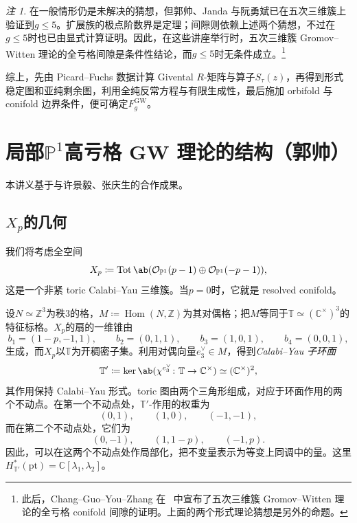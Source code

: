 \documentclass{amsart}
\theoremstyle{definition}
\theoremstyle{remark}
\newtheorem{rmk}[thm]{注}
\theoremstyle{plain}
\theoremstyle{definition}
\theoremstyle{remark}
\newcommand{\C}{\mathbb{C}}
\newcommand{\Z}{\mathbb{Z}}
\renewcommand{\P}{\mathbb{P}}
\newcommand{\mc}[1]{\mathcal{#1}}
\newcommand{\T}{\mathbb{T}}
\newcommand{\mr}[1]{\mathrm{#1}}
\newcommand{\on}[1]{\operatorname{#1}}
\newcommand{\1}{\mathbf{1}}
\newcommand{\2}{\mathbf{2}}
\newcommand{\3}{\mathbf{3}}
\DeclareMathOperator{\Hom}{Hom}
\begin{document}
\begin{rmk}
    在一般情形仍是未解决的猜想，但郭帅、Janda 与阮勇斌已在五次三维簇上验证到\(g \leq 5\)。扩展族的极点阶数界是定理；间隙则依赖上述两个猜想，不过在\(g \leq 5\)时也已由显式计算证明。因此，在这些讲座举行时，五次三维簇 Gromov--Witten 理论的全亏格间隙是条件性结论，而\(g \leq 5\)时无条件成立。\footnote{此后，Chang--Guo--You--Zhang 在~\cite{CGYZ2026} 中宣布了五次三维簇 Gromov--Witten 理论的全亏格 conifold 间隙的证明。上面的两个形式理论猜想是另外的命题。}
\end{rmk}

综上，先由 Picard--Fuchs 数据计算 Givental \(R\)-矩阵与算子\(S_{\tau}(z)\)，再得到形式稳定图和亚纯剩余图，利用全纯反常方程与有限生成性，最后施加 orbifold 与 conifold 边界条件，便可确定\(F_g^{\mr{GW}}\)。

\section{\texorpdfstring{局部\(\P^1\)高亏格 GW 理论的结构}{局部 P1 高亏格 GW 理论的结构}（郭帅）}%
\label{sec:Structure of higher-genus GW theory of local P1 (郭帅)}

本讲义基于与许景毅、张庆生的合作成果。

\subsection{\(X_p\)的几何}%
\label{sub:The geometry of Xp}

我们将考虑全空间
\[ X_p \coloneqq \on{Tot}\ab(\mc{O}_{\P^1}(p-1) \oplus \mc{O}_{\P^1}(-p-1)), \]
这是一个非紧 toric Calabi--Yau 三维簇。当\(p=0\)时，它就是 resolved conifold。

设\(N \simeq \Z^3\)为秩\(3\)的格，\(M \coloneqq \Hom(N,\Z)\)为其对偶格；把\(M\)等同于\(\T \simeq (\C^{\times})^3\)的特征标格。\(X_p\)的扇的一维锥由
\[ b_1 = (1-p,-1,1), \qquad b_2 = (0,1,1), \qquad b_3 = (1,0,1), \qquad b_4 = (0,0,1), \]
生成，而\(X_p\)以\(\T\)为开稠密子集。利用对偶向量\(e_3^{\vee} \in M\)，得到\textit{Calabi--Yau 子环面}
\[ \T' \coloneqq \ker\ab(\chi^{e_3^{\vee}} \colon \T \to \C^{\times}) \simeq (\C^{\times})^2, \]
其作用保持 Calabi--Yau 形式。toric 图由两个三角形组成，对应于环面作用的两个不动点。在第一个不动点处，\(\T'\)-作用的权重为
\[ (0,1), \qquad (1,0), \qquad (-1,-1), \]
而在第二个不动点处，它们为
\[ (0,-1), \qquad (1,1-p), \qquad (-1,p). \]
因此，可以在这两个不动点处作局部化，把不变量表示为等变上同调中的量。这里\(H^*_{\T'}(\mr{pt}) = \C[\lambda_1,\lambda_2]\)。
\end{document}
